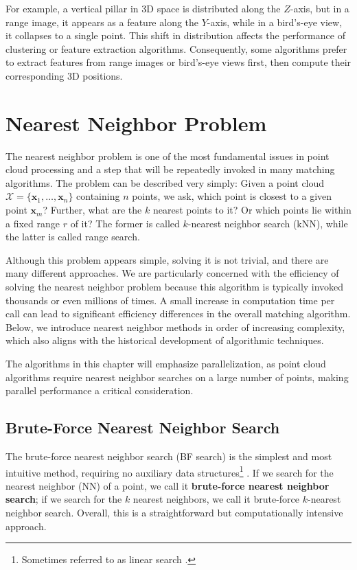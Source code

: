 For example, a vertical pillar in 3D space is distributed along the $Z$-axis, but in a range image, it appears as a feature along the $Y$-axis, while in a bird's-eye view, it collapses to a single point. This shift in distribution affects the performance of clustering or feature extraction algorithms. Consequently, some algorithms prefer to extract features from range images or bird's-eye views first, then compute their corresponding 3D positions.

\section{Nearest Neighbor Problem}
The nearest neighbor problem is one of the most fundamental issues in point cloud processing and a step that will be repeatedly invoked in many matching algorithms. The problem can be described very simply: Given a point cloud $\mathcal{X} = \{ \bm{x}_1, \ldots, \bm{x}_n\}$ containing $n$ points, we ask, which point is closest to a given point $\bm{x}_m$? Further, what are the $k$ nearest points to it? Or which points lie within a fixed range $r$ of it? The former is called $k$-nearest neighbor search (kNN), while the latter is called range search.  

Although this problem appears simple, solving it is not trivial, and there are many different approaches. We are particularly concerned with the efficiency of solving the nearest neighbor problem because this algorithm is typically invoked thousands or even millions of times. A small increase in computation time per call can lead to significant efficiency differences in the overall matching algorithm. Below, we introduce nearest neighbor methods in order of increasing complexity, which also aligns with the historical development of algorithmic techniques.  

The algorithms in this chapter will emphasize parallelization, as point cloud algorithms require nearest neighbor searches on a large number of points, making parallel performance a critical consideration.  

\subsection{Brute-Force Nearest Neighbor Search}  
The brute-force nearest neighbor search (BF search) is the simplest and most intuitive method, requiring no auxiliary data structures\footnote{Sometimes referred to as linear search \cite{Weber1998}.} \cite{Kuang2009}. If we search for the nearest neighbor (NN) of a point, we call it \textbf{brute-force nearest neighbor search}; if we search for the $k$ nearest neighbors, we call it brute-force $k$-nearest neighbor search. Overall, this is a straightforward but computationally intensive approach.  

